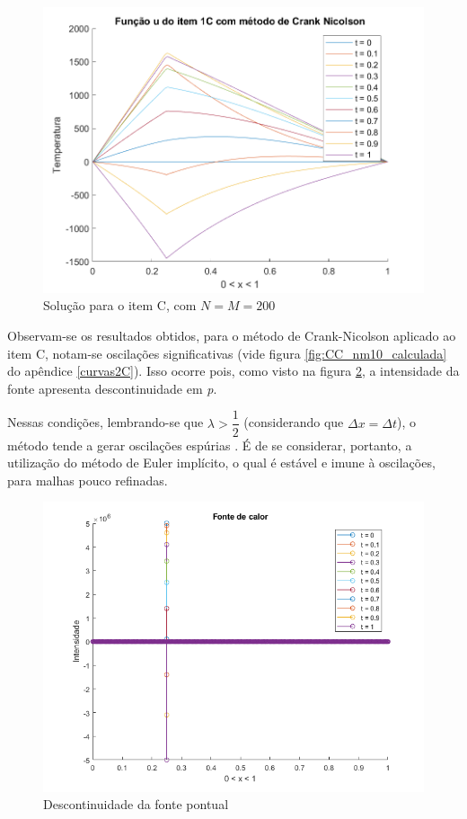 \documentclass[12pt]{article}
\begin{document}
\begin{spacing}{1.5}
\begin{figure}[ht!]
    \centering
    \includegraphics[width=0.45\linewidth]{Segunda_Tarefa/ItemC/itemC_2D.png}
    \caption{Solução para o item C, com $N=M=200$}
    \label{fig:Tarefa2C_itemC_2D}
\end{figure}

\clearpage
Observam-se os resultados obtidos, para o método de Crank-Nicolson aplicado ao item C, notam-se oscilações significativas (vide figura \ref{fig:CC_nm10_calculada} do apêndice \ref{curvas2C}). Isso ocorre pois, como visto na figura \ref{fig:fonte_pontual}, a intensidade da fonte apresenta descontinuidade em \textit{p}. 

Nessas condições, lembrando-se que $\lambda > \dfrac{1}{2}$ (considerando que $\Delta x = \Delta t$), o método tende a gerar oscilações espúrias \supercite{osterby}. É de se considerar, portanto, a utilização do método de Euler implícito, o qual é estável e imune à oscilações, para malhas pouco refinadas.

\vspace{1cm}
\begin{figure}[ht]
    \centering
    \includegraphics[width=0.8\linewidth]{Segunda_Tarefa/ItemC/fonte.png}
    \caption{Descontinuidade da fonte pontual}
    \label{fig:fonte_pontual}
\end{figure}



\end{spacing}
\end{document}
